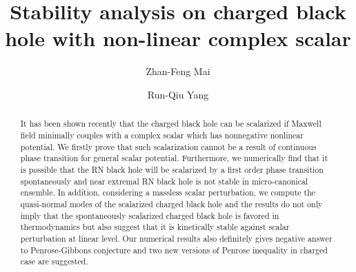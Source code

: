 \documentclass[pr, twocolumn, preprintnumbers, showpacs,footnoteadded, superscriptaddress,nofootinbib,longbibliography]{revtex4-1}
\begin{document}
\title{\boldmath Stability analysis on charged black hole with non-linear complex scalar}
\author{Zhan-Feng Mai}
\author{Run-Qiu Yang}




\begin{abstract}
It has been shown recently that the charged black hole can be scalarized if Maxwell field minimally couples with a complex scalar which has nonnegative nonlinear potential. We firstly prove that such scalarization cannot be a result of continuous phase transition for general scalar potential. Furthermore, we numerically find that it is possible that the RN black hole will be scalarized by a first order phase transition spontaneously and near extremal RN black hole is not stable in micro-canonical ensemble. In addition, considering a massless scalar perturbation, we compute the quasi-normal modes of the scalarized charged black hole and the results do not only imply that the spontaneously scalarized charged black hole is favored in thermodynamics but also suggest that it is kinetically stable against scalar perturbation at linear level. Our numerical results also definitely gives negative answer to Penrose-Gibbons conjecture and two new versions of Penrose inequality in charged case are suggested.
\end{abstract}

\maketitle
\flushbottom

\noindent
\end{document}
